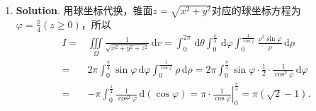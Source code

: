 \documentclass[../main.tex]{subfiles}
\begin{document}
\begin{enumerate}
    \item \textbf{Solution}. 用球坐标代换，锥面$z=\sqrt{x^{2}+y^{2}}$对应的球坐标方程为$\varphi
              = \frac{\pi}{4}(z\geq 0)$，所以
          \[
              \begin{aligned}
                  I = {} & \iiint\limits_{\Omega}\frac{1}{\sqrt{x^2+y^2+z^2}}\,\mathrm{d}v = \int_{0}^{2\pi}\,\mathrm{d}\theta\int_{0}^{\frac{\pi}{4}}\,\mathrm{d}\varphi\int_{0}^{\frac{1}{\cos \varphi}}\frac{\rho^{2}\sin \varphi}{\rho}\,\mathrm{d}\rho \\
                  = {}   & 2\pi\int_{0}^{\frac{\pi}{4}}\sin \varphi\,\mathrm{d}\varphi\int_{0}^{\frac{1}{\cos \varphi}}\rho\,\mathrm{d}\rho = 2\pi\int_{0}^{\frac{\pi}{4}}\sin \varphi \cdot \frac{1}{2}\cdot \frac{1}{\cos^{2} \varphi}\,\mathrm{d}\varphi \\
                  = {}   & -\pi\int_{0}^{\frac{\pi}{4}}\frac{1}{\cos^2 \varphi}\,\mathrm{d}(\cos \varphi) = \left.\pi\cdot \frac{1}{\cos \varphi}\right|_{0}^{\frac{\pi}{4}}= \pi\left(\sqrt{2}-1\right).
              \end{aligned}
          \]
\end{enumerate}
\end{document}
